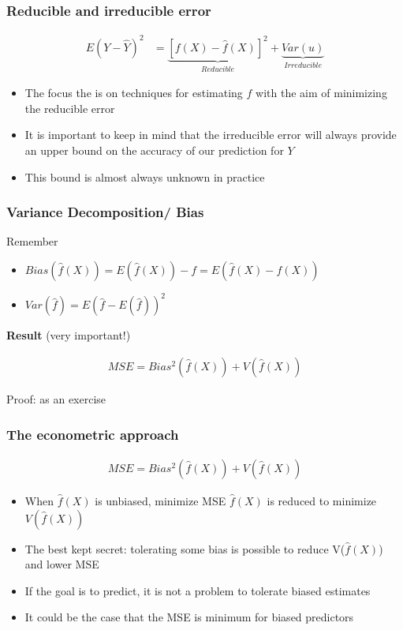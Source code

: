 \documentclass[
  shownotes,
  xcolor={svgnames},
  hyperref={colorlinks,citecolor=DarkBlue,linkcolor=DarkRed,urlcolor=DarkBlue}
  ]{beamer}
\begin{document}
\begin{frame}
\frametitle{Reducible and irreducible error}

\begin{align}
E(Y-\hat Y)^2  &= \underset{Reducible}{\underbrace{[f(X)-\hat{f}(X)]^{2}}}+\underset{Irreducible}{\underbrace{Var(u)}}
\end{align}
\bigskip
\begin{itemize}
\item The focus the is on techniques for estimating $f$ with the aim of minimizing the reducible error
\medskip
\item It is important to keep in mind that the irreducible error will always provide an upper bound on the accuracy of our prediction for $Y$
\medskip
\item This bound is almost always unknown in practice
\end{itemize}

\end{frame}

\begin{frame}
\frametitle{Variance Decomposition/ Bias}

Remember
\begin{itemize}
  \item $Bias (\hat f(X) )=E (\hat f(X) )-f=E (\hat f(X)-f(X))$
  \item  $Var (\hat f)  =E (\hat f - E (\hat f))^2$
\end{itemize}

\bigskip
{\bf Result} (very important!)
\bigskip

\begin{align}
  MSE = Bias^2 (\hat f(X))+V (\hat f(X))
\end{align}

{\tiny Proof: as an exercise}

\end{frame}

\begin{frame}
\frametitle{The econometric approach}

\begin{align}
MSE = Bias^2 (\hat f(X))+V (\hat f(X))
\end{align}

\bigskip

\begin{itemize}
  \item  When $\hat f(X)$ is unbiased, minimize MSE $\hat f(X)$ is reduced to minimize  $V(\hat f(X))$
  \medskip
  \item The best kept secret: tolerating some bias is possible to reduce V($\hat f(X)$) and lower MSE
  \medskip
  \item  If the goal is to predict, it is not a problem to tolerate biased estimates
  \medskip
  \item  It could be the case that the MSE is minimum for biased predictors
\end{itemize}
\end{frame}
\end{document}

